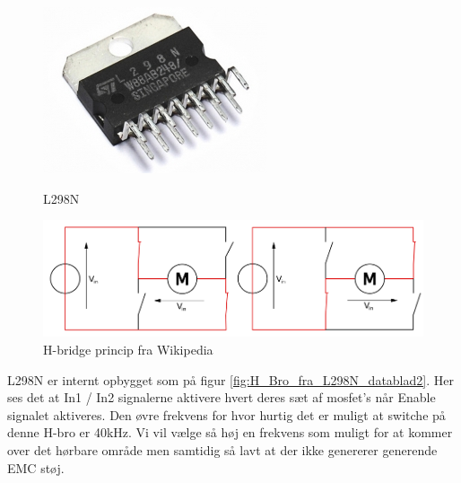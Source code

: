 \begin{figure}[ht]
	\centering
	\begin{minipage}[b]{0.29\linewidth}
		\includegraphics[width=\textwidth* 9/10]{../fig/billeder/L298N}
		\caption{L298N}
		\label{fig:L298N}
	\end{minipage}
	\quad
	\begin{minipage}[b]{0.68\linewidth}
		\includegraphics[width=\textwidth* 9/10]{../fig/billeder/H_bridge_operating}
		\caption{H-bridge princip fra Wikipedia \cite{wikiHbro}}
		\label{fig:H-bridge}
	\end{minipage}
\end{figure}

L298N er internt opbygget som på figur \ref{fig:H_Bro_fra_L298N_datablad2}. Her ses det at In1 / In2 signalerne aktivere hvert deres sæt af mosfet's når Enable signalet aktiveres. Den øvre frekvens for hvor hurtig det er muligt at switche på denne H-bro er 40kHz. Vi vil vælge så høj en frekvens som muligt for at kommer over det hørbare område men samtidig så lavt at der ikke genererer generende EMC støj.

